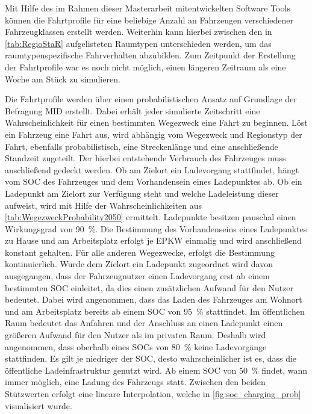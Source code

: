 Mit Hilfe des im Rahmen dieser Masterarbeit mitentwickelten Software Tools \simbev können die Fahrtprofile für eine beliebige Anzahl an Fahrzeugen verschiedener Fahrzeugklassen erstellt werden.
Weiterhin kann hierbei zwischen den in \autoref{tab:RegioStaR} aufgelisteten \Regiostar Raumtypen unterschieden werden, um das raumtypenspezifische Fahrverhalten abzubilden.
Zum Zeitpunkt der Erstellung der Fahrtprofile war es noch nicht möglich, einen längeren Zeitraum als eine Woche am Stück zu simulieren.



Die Fahrtprofile werden über einen probabilistischen Ansatz auf Grundlage der Befragung \gls{MID} \cite{ISGH2017} erstellt.
Dabei erhält jeder simulierte Zeitschritt eine Wahrscheinlichkeit für einen bestimmten Wegezweck eine Fahrt zu beginnen.
Löst ein Fahrzeug eine Fahrt aus, wird abhängig vom Wegezweck und Regionstyp der Fahrt, ebenfalls probabilistisch, eine Streckenlänge und eine anschließende Standzeit zugeteilt.
Der hierbei entstehende Verbrauch des Fahrzeuges muss anschließend gedeckt werden.
Ob am Zielort ein Ladevorgang stattfindet, hängt vom \gls{SOC} des Fahrzeuges und dem Vorhandensein eines Ladepunktes ab.
Ob ein Ladepunkt am Zielort zur Verfügung steht und welche Ladeleistung dieser aufweist, wird mit Hilfe der Wahrscheinlichkeiten aus \autoref{tab:WegezweckProbability2050} ermittelt.
Ladepunkte besitzen pauschal einen Wirkungsgrad von \SI{90}{\percent}. %
Die Bestimmung des Vorhandenseins eines Ladepunktes zu Hause und am Arbeitsplatz erfolgt je \gls{EPKW} einmalig und wird anschließend konstant gehalten.
Für alle anderen Wegezwecke, erfolgt die Bestimmung kontinuierlich.
Wurde dem Zielort ein Ladepunkt zugeordnet wird davon ausgegangen, dass der Fahrzeugnutzer einen Ladevorgang erst ab einem bestimmten \gls{SOC} einleitet, da dies einen zusätzlichen Aufwand für den Nutzer bedeutet.
Dabei wird angenommen, dass das Laden des Fahrzeuges am Wohnort und am Arbeitsplatz bereits ab einem \gls{SOC} von \SI{95}{\percent} stattfindet.
Im öffentlichen Raum bedeutet das Anfahren und der Anschluss an einen Ladepunkt einen größeren Aufwand für den Nutzer als im privaten Raum.
Deshalb wird angenommen, dass oberhalb eines \glspl{SOC} von \SI{80}{\percent} keine Ladevorgänge stattfinden.
Es gilt je niedriger der \gls{SOC}, desto wahrscheinlicher ist es, dass die öffentliche Ladeinfrastruktur genutzt wird.
Ab einem \gls{SOC} von \SI{50}{\percent} findet, wann immer möglich, eine Ladung des Fahrzeugs statt.
Zwischen den beiden Stützwerten erfolgt eine lineare Interpolation, welche in \autoref{fig:soc_charging_prob} visualisiert wurde.

